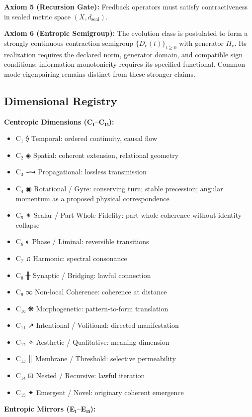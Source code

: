 \documentclass[11pt,a4paper]{article}
\begin{document}
\textbf{Axiom 5 (Recursion Gate):} Feedback operators must satisfy contractiveness in sealed metric space \( (X, d_{\mathrm{seal}}) \).

\textbf{Axiom 6 (Entropic Semigroup):} The evolution class is postulated to form a strongly continuous contraction semigroup \( \{D_e(t)\}_{t \geq 0} \) with generator \( H_e \). Its realization requires the declared norm, generator domain, and compatible sign conditions; information monotonicity requires its specified functional. Common-mode eigenpairing remains distinct from these stronger claims.

\subsection{Dimensional Registry}

\textbf{Centropic Dimensions (C₁–C₁₅):}

\begin{itemize}
\item C₁ ⟠ Temporal: ordered continuity, causal flow
\item C₂ ◈ Spatial: coherent extension, relational geometry
\item C₃ ⟿ Propagational: lossless transmission
\item C₄ ◉ Rotational / Gyre: conserving turn; stable precession; angular momentum as a proposed physical correspondence
\item C₅ ✴ Scalar / Part-Whole Fidelity: part-whole coherence without identity-collapse
\item C₆ ◐ Phase / Liminal: reversible transitions
\item C₇ ♫ Harmonic: spectral consonance
\item C₈ ╫ Synaptic / Bridging: lawful connection
\item C₉ ∞ Non-local Coherence: coherence at distance
\item C₁₀ ❋ Morphogenetic: pattern-to-form translation
\item C₁₁ ↗ Intentional / Volitional: directed manifestation
\item C₁₂ ✧ Aesthetic / Qualitative: meaning dimension
\item C₁₃ ║ Membrane / Threshold: selective permeability
\item C₁₄ ⊡ Nested / Recursive: lawful iteration
\item C₁₅ ✦ Emergent / Novel: originary coherent emergence
\end{itemize}

\textbf{Entropic Mirrors (E₁–E₁₅):}
\end{document}
